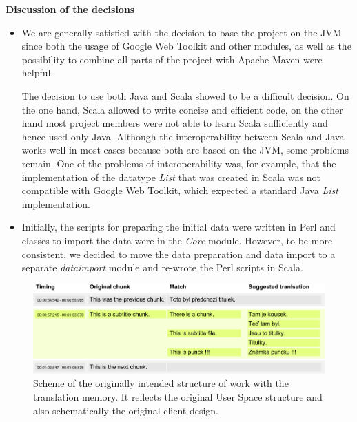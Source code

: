\noindent\textbf{Discussion of the decisions}

\begin{itemize}
	\item We are generally satisfied with the decision to base the project on the JVM since both the usage of Google Web Toolkit and other modules, as well as the possibility to combine all parts of the project with Apache Maven were helpful. 
	
	The decision to use both Java and Scala showed to be a difficult decision. On the one hand, Scala allowed to write concise and efficient code, on the other hand most project members were not able to learn Scala sufficiently and hence used only Java. Although the interoperability between Scala and Java works well in most cases because both are based on the JVM, some problems remain. One of the problems of interoperability was, for example, that the implementation of the datatype \emph{List} that was created in Scala was not compatible with Google Web Toolkit, which expected a standard Java \emph{List} implementation.
\end{itemize}


\begin{itemize}
	\item  Initially, the scripts for preparing the initial data were written in Perl and classes to import the data were in the \emph{Core} module. However, to be more consistent, we decided to move the data preparation and data import to a separate \emph{dataimport} module and re-wrote the Perl scripts in Scala.
\end{itemize}

\begin{figure}[h]
\begin{center}
\includegraphics{./figures/original_strucutre.pdf}
\end{center}

\caption{Scheme of the originally intended structure of work with the translation memory. It reflects the original User Space structure and also schematically the original client design.}

\end{figure}

